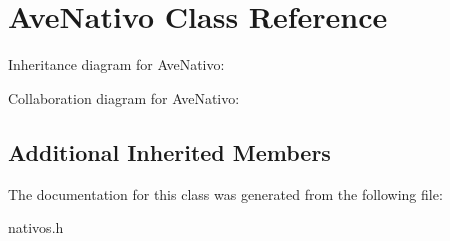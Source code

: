 \hypertarget{classAveNativo}{}\section{Ave\+Nativo Class Reference}
\label{classAveNativo}


Inheritance diagram for Ave\+Nativo\+:


Collaboration diagram for Ave\+Nativo\+:
\subsection*{Additional Inherited Members}


The documentation for this class was generated from the following file\+:\begin{DoxyCompactItemize}
\item 
nativos.\+h\end{DoxyCompactItemize}
